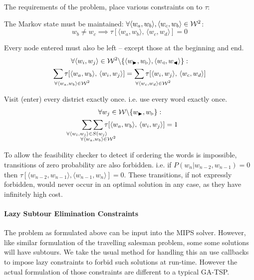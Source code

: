 \documentclass[twocolumn]{article}
\begin{document}
The requirements of the problem, place various constraints on to $\tau$:

The Markov state must be maintained: $\forall\langle w_{a},w_{b}\rangle,\langle w_{c},w_{b}\rangle\in\mathcal{W}^{2}$:
\begin{equation*}
w_{b}\ne w_{c} \implies \tau[\langle w_{a},w_{b}\rangle,\,\langle w_{c},w_{d}\rangle]=0
\end{equation*}

Every node entered must also be left -- except those at the beginning and end.
\begin{multline*}
\forall\langle w_{i},w_{j}\rangle\in\W^{2}\backslash\{\langle\s,\ss\rangle,\langle\e,\ee\rangle\}: \\
 \sum_{\mathrlap{\!\!\!\!\forall\langle w_{a},w_{b}\rangle\in\W^{2}}}\tau[\langle w_{a},w_{b}\rangle,\,\langle w_{i},w_{j}\rangle]
=\sum_{\mathrlap{\!\!\!\!\forall\langle w_{c},w_{d}\rangle\in\W^{2}}}\tau[\langle w_{i},w_{j}\rangle,\,\langle w_{c},w_{d}\rangle]
\end{multline*}

Visit (enter) every district exactly once. i.e. use every word exactly once.
\begin{multline*}
\forall w_{j}\in\W\backslash\{\s,\ss\}: \\
\sum_{\mathclap{\forall\langle w_{i},w_{j}\rangle\in S(w_{j}\rangle}}
\sum_{\mathclap{\substack{\; \\ \;\\ \forall\langle w_{a},w_{b}\rangle\in\W^{2}}}}
\tau[\langle w_{a},w_{b}\rangle,\,\langle w_{i},w_{j}\rangle]=1
\end{multline*}

To allow the feasibility checker to detect if ordering the words is
impossible, transitions of zero probability are also forbidden. i.e. if
$P(w_{n}|w_{n-2},w_{n-1})=0$ then $\tau[\langle w_{n-2},w_{n-1}\rangle,\langle w_{n-1},w_{n}\rangle]=0$.
These transitions, if not expressly forbidden, would never occur in
an optimal solution in any case, as they have infinitely high cost.


\paragraph{Lazy Subtour Elimination Constraints}

The problem as formulated above can be input into the MIPS solver. However, like similar formulation of the
travelling salesman problem, some some solutions will have subtours.
We take the usual method for handling this an use callbacks to impose
lazy constraints to forbid such solutions at run-time.  
However the actual formulation of those constraints are different to a typical GA-TSP.
\end{document}
